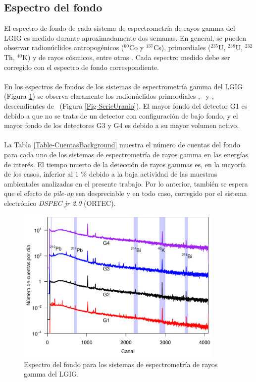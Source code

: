 		\subsection{Espectro del fondo}\label{SubSec-Fondos}
El espectro de fondo de cada sistema de espectrometría de rayos gamma del LGIG es medido durante aproximadamente dos semanas. En general, se pueden observar radionúclidos antropogénicos ($^{60}$Co y $^{137}$Cs), primordiales ($^{235}$U, $^{238}$U, $^{232}$Th, $^{40}$K) y de rayos cósmicos, entre otros \cite{gilmore2008}. Cada espectro medido debe ser corregido con el espectro de fondo correspondiente. 
\\
\\
En los espectros de fondos de los sistemas de espectrometría gamma del LGIG (Figura \ref{Fig-Fondos}) se observa claramente los radionúclidos primordiales \Kcuarenta, \PbCuatro\, y \BiCuatro, descendientes de \UDosTresOcho\, (Figura \ref{Fig-SerieUranio}). El mayor fondo del detector G1 es debido a que no se trata de un detector con configuración de bajo fondo, y el mayor fondo de los detectores G3 y G4 es debido a su mayor volumen activo. 
\\
\\
La Tabla \ref{Table-CuentasBackground} muestra el número de cuentas del fondo para cada uno de los sistemas de espectrometría de rayos gamma en las energías de interés. El tiempo muerto de la detección de rayos gammas es, en la mayoría de los casos, inferior al 1 \% debido a la baja actividad de las muestras ambientales analizadas en el presente trabajo. Por lo anterior, también se espera que el efecto de \textit{pile-up} sea despreciable y en todo caso, corregido por el sistema electrónico \textit{DSPEC jr 2.0} (ORTEC). 
\begin{figure}[h]
\includegraphics[width=0.9\textwidth]{Imagenes/Fondos.pdf}
\caption{Espectro del fondo para los sistemas de espectrometría de rayos gamma del LGIG.}\label{Fig-Fondos}
\end{figure}
